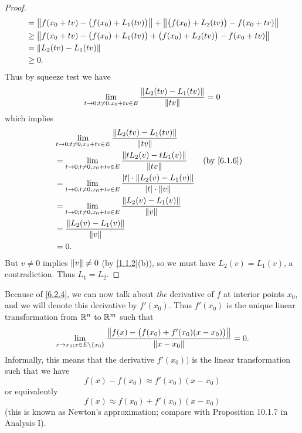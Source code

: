 \begin{proof}
\begin{align*}
     & = \norm*{f(x_0 + tv) - \big(f(x_0) + L_1(tv)\big)} + \norm*{\big(f(x_0) + L_2(tv)\big) - f(x_0 + tv)} \\
     & \geq \norm*{f(x_0 + tv) - \big(f(x_0) + L_1(tv)\big) + \big(f(x_0) + L_2(tv)\big) - f(x_0 + tv)}      \\
     & = \norm*{L_2(tv) - L_1(tv)}                                                                           \\
     & \geq 0.
  \end{align*}
  Thus by squeeze test we have
  \[
    \lim_{t \to 0 ; t \neq 0, x_0 + tv \in E} \dfrac{\norm*{L_2(tv) - L_1(tv)}}{\norm*{tv}} = 0
  \]
  which implies
  \begin{align*}
     & \lim_{t \to 0 ; t \neq 0, x_0 + tv \in E} \dfrac{\norm*{L_2(tv) - L_1(tv)}}{\norm*{tv}}                                            \\
     & = \lim_{t \to 0 ; t \neq 0, x_0 + tv \in E} \dfrac{\norm*{t L_2(v) - t L_1(v)}}{\norm*{tv}}                        &  & \by{6.1.6} \\
     & = \lim_{t \to 0 ; t \neq 0, x_0 + tv \in E} \dfrac{\abs{t} \cdot \norm*{L_2(v) - L_1(v)}}{\abs{t} \cdot \norm*{v}}                 \\
     & = \lim_{t \to 0 ; t \neq 0, x_0 + tv \in E} \dfrac{\norm*{L_2(v) - L_1(v)}}{\norm*{v}}                                             \\
     & = \dfrac{\norm*{L_2(v) - L_1(v)}}{\norm*{v}}                                                                                       \\
     & = 0.
  \end{align*}
  But \(v \neq 0\) implies \(\norm*{v} \neq 0\) (by \cref{1.1.2}(b)), so we must have \(L_2(v) = L_1(v)\), a contradiction.
  Thus \(L_1 = L_2\).
\end{proof}

\begin{note}
  Because of \cref{6.2.4}, we can now talk about \emph{the} derivative of \(f\) at interior points \(x_0\), and we will denote this derivative by \(f'(x_0)\).
  Thus \(f'(x_0)\) is the unique linear transformation from \(\R^n\) to \(\R^m\) such that
  \[
    \lim_{x \to x_0 ; x \in E \setminus \set{x_0}} \dfrac{\norm*{f(x) - \big(f(x_0) + f'(x_0)(x - x_0)\big)}}{\norm*{x - x_0}} = 0.
  \]
  Informally, this means that the derivative \(f'(x_0))\) is the linear transformation such that we have
  \[
    f(x) - f(x_0) \approx f'(x_0)(x - x_0)
  \]
  or equivalently
  \[
    f(x) \approx f(x_0) + f'(x_0)(x - x_0)
  \]
  (this is known as Newton's approximation;
  compare with Proposition 10.1.7 in Analysis I).
\end{note}

